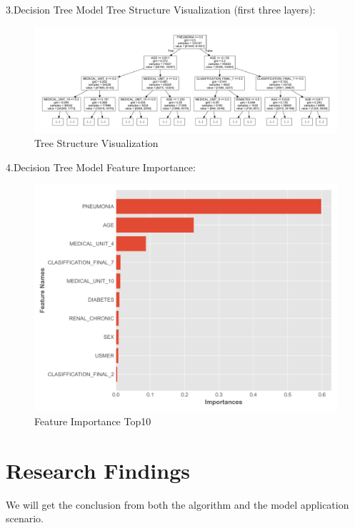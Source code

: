 \documentclass[
  journal=medium,
  manuscript=Report,
  year=2023,
  volume=37,
]{cup-journal}
\begin{document}
3.Decision Tree Model Tree Structure Visualization (first three layers):

\begin{figure}[!hbtp]
    \centering
    \includegraphics[width=\linewidth]{decision_tree.pdf}
    \caption{Tree Structure Visualization}
    \label{Tree Structure Visualization}
\end{figure}

\newpage
4.Decision Tree Model Feature Importance:

\begin{figure}[!hbtp]
    \centering
    \includegraphics[width=0.6\linewidth]{pic/fefature_importance.png}
    \caption{Feature Importance Top10}
    \label{Feature Importance Top10}
\end{figure}


\section{Research Findings}

We will get the conclusion from both the algorithm and the model application scenario.
\end{document}
